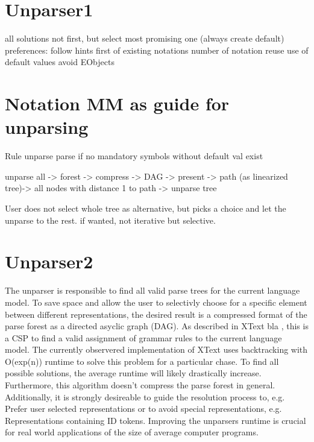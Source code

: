 \section{Unparser1}
all solutions not first, but select most promising one (always create default)
preferences:
follow hints first of existing notations
number of notation reuse
use of default values
avoid EObjects

\section{Notation MM as guide for unparsing}

Rule unparse parse if no mandatory symbols without default val exist


unparse all -> forest -> compress -> DAG -> present -> path (as linearized tree)-> all nodes with distance 1 to path -> unparse tree

User does not select whole tree as alternative, but picks a choice and let the unparse to the rest. if wanted, not iterative but selective.



\section{Unparser2}
The unparser is responsible to find all valid parse trees for the current language model. To save space and allow the user to selectivly choose for a specific element between different representations, the desired result is a compressed format of the parse forest as a directed asyclic graph (DAG).  As described in XText bla , this is a CSP to find a valid assignment of grammar rules to the current language model. The currently observered implementation of XText uses backtracking with O(exp(n)) runtime to solve this problem for a particular chase. To find all possible solutions, the average runtime will likely drastically increase. Furthermore, this algorithm doesn't compress the parse forest in general. Additionally, it is strongly desireable to guide the resolution process to, e.g. Prefer user selected representations or to avoid special representations, e.g. Representations containing ID tokens. Improving the unparsers runtime is crucial for real world applications of the size of average computer programs.

